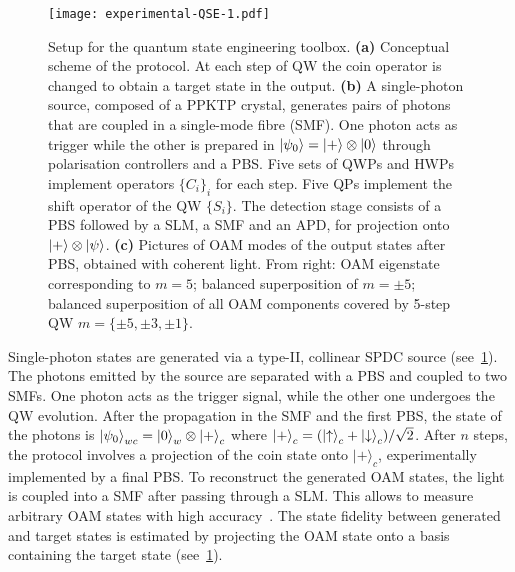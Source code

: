 \begin{figure}[tb]
\texttt{[image: experimental-QSE-1.pdf]}
\caption{
	Setup for the quantum state engineering toolbox.
	\textbf{(a)} Conceptual scheme of the protocol. At each step of \ac{QW} the coin operator is changed to obtain a target state in the output.
	\textbf{(b)} A single-photon source, composed of a \ac{PPKTP} crystal, generates pairs of photons that are coupled in a single-mode fibre (SMF). One photon acts as trigger while the other is prepared in $\ket{\psi_0}=\ket{+}\otimes \ket{0}$ through polarisation controllers and a \ac{PBS}. Five sets of \acp{QWP} and \acp{HWP}  implement operators $\{ C_i\}_i$ for each step. Five \acp{QP} implement the shift operator of the \ac{QW} $\{S_i\}$.
	The detection stage consists of a \ac{PBS} followed by a \ac{SLM}, a \ac{SMF} and an \ac{APD}, for projection onto $\ket{+} \otimes \ket{\psi}$.
	\textbf{(c)} Pictures of \ac{OAM} modes of the output states after \ac{PBS}, obtained with coherent light. From right: \ac{OAM} eigenstate corresponding to $m=5$; balanced superposition of $m=\pm 5$; balanced superposition of all \ac{OAM} components covered by 5-step \ac{QW} $m=\{\pm 5, \pm 3, \pm 1\}$.
}
\label{fig:expQWs:schematics}
\end{figure}


Single-photon states are generated via a type-II, collinear \ac{SPDC} source (see~\cref{fig:expQWs:schematics}).
The photons emitted by the source are separated with a \acf{PBS} and coupled to two \acfp{SMF}. One photon acts as the trigger signal, while the other one undergoes the \ac{QW} evolution. After the propagation in the \ac{SMF} and the first \ac{PBS}, the state of the photons is $\ket{\psi_0}_{wc}=\ket{0}_w \otimes \ket{+}_c$ where $\ket{+}_c=(\ket{{\uparrow}}_c+\ket{{\downarrow}}_c)/\sqrt2$. After $n$ steps, the protocol involves a projection of the coin state onto $|+\rangle_c$, experimentally implemented by a final \ac{PBS}.
To reconstruct the generated \ac{OAM} states, the light is coupled into a \ac{SMF} after passing through a \ac{SLM}.
This allows to measure arbitrary \ac{OAM} states with high accuracy~\cite{bolduc2013exact,dambrosio2013test}.
The state fidelity between generated and target states is estimated by projecting the \ac{OAM} state onto a basis containing the target state (see~\cref{fig:expQWs:schematics}).




